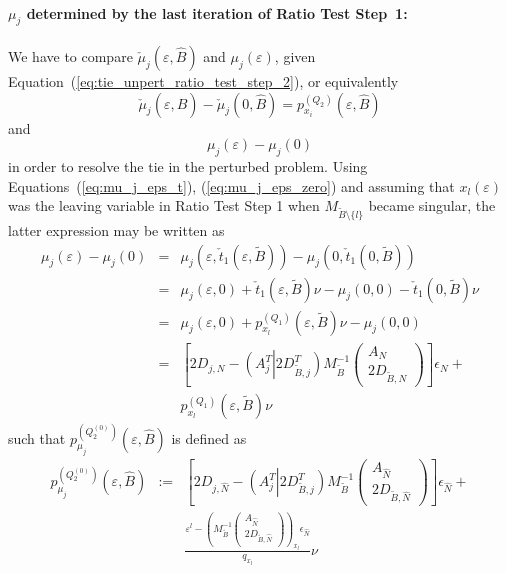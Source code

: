 \documentclass[a4paper]{article}
\newcommand{\pmu}[2]{\ensuremath{p_{\mu_{j}}^{(#1)}(\varepsilon, #2)}}
\begin{document}
\paragraph{$\mu_{j}$ determined by the last iteration of Ratio Test Step~1:}
We have to compare $\check{\mu}_{j}(\varepsilon, \hat{B})$ and
$\mu_{j}(\varepsilon)$, given Equation~(\ref{eq:tie_unpert_ratio_test_step_2}),
or equivalently
\begin{equation*}
  \check{\mu}_{j}(\varepsilon, \hat{B}) -
  \check{\mu}_{j}(0, \hat{B})= p_{x_{i}}^{(Q_{2})}(\varepsilon, \hat{B})
\end{equation*}
and
\begin{equation*}
\mu_{j}\left(\varepsilon\right) - \mu_{j}\left(0\right)
\end{equation*}
in order to resolve the tie in the perturbed problem.
Using Equations~(\ref{eq:mu_j_eps_t}), (\ref{eq:mu_j_eps_zero}) and assuming
that $x_{l}(\varepsilon)$ was the leaving variable in Ratio Test Step 1
when $M_{\tilde{B} \setminus \{l\}}$ became singular, the latter expression
may be written as
\begin{eqnarray*}
  \mu_{j}\left(\varepsilon\right) - \mu_{j}\left(0\right) &=&
  \mu_{j}(\varepsilon, \check{t}_{1}(\varepsilon, \tilde{B})) -
  \mu_{j}(0, \check{t}_{1}(0, \tilde{B})) \\
  &=&
  \mu_{j}\left(\varepsilon, 0\right) +
  \check{t}_{1}(\varepsilon, \tilde{B})\nu -
  \mu_{j}\left(0, 0\right) -
  \check{t}_{1}(0, \tilde{B})\nu \\
  &=&
  \mu_{j}\left(\varepsilon,0\right)
  +p_{x_{l}}^{(Q_{1})}(\varepsilon, \tilde{B})\nu -
  \mu_{j}(0, 0) \\
  &=&
  \left[
      2D_{j, N} - \left(A_{j}^{T} \left| \right. 2D_{\tilde{B}, j}^{T} \right)
      M_{\tilde{B}}^{-1}
      \left(\begin{array}{c}
              A_{N} \\
	      \hline
	      2D_{\tilde{B}, N}
	    \end{array}
      \right)
   \right]\epsilon_{N} + \\
   && p_{x_{l}}^{(Q_{1})}(\varepsilon, \tilde{B})\nu
\end{eqnarray*}
such that \pmu{Q_{2}^{(0)}}{\hat{B}} is defined as
\begin{eqnarray}
\label{def:p_mu_j_Q_2_0}
\pmu{Q_{2}^{(0)}}{\hat{B}} &:=& 
  \left[
      2D_{j, \hat{N}} - \left(A_{j}^{T} \left| \right. 2D_{\tilde{B}, j}^{T}
       \right)
      M_{\tilde{B}}^{-1}
      \left(\begin{array}{c}
              A_{\hat{N}} \\
	      \hline
	      2D_{\tilde{B}, \hat{N}}
	    \end{array}
      \right)
   \right]\epsilon_{\hat{N}} + 
 \nonumber \\ 
  &&
  \frac{\varepsilon^{l} -
         \left(M_{\tilde{B}}^{-1}
           \left(\begin{array}{c}
                    A_{\hat{N}}  \\
	            \hline
	            2D_{\tilde{B}, \hat{N}}
	         \end{array}
	   \right)
         \right)_{x_{l}}\epsilon_{\hat{N}}}{q_{x_{l}}}\nu
\end{eqnarray}
\end{document}
